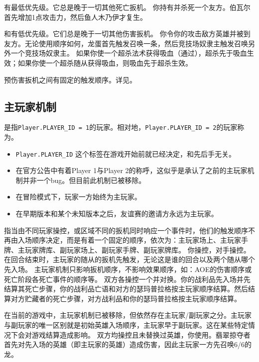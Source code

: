 有最低优先级。它总是晚于一切其他死亡扳机。
\example 你持有并杀死一个友方。伯瓦尔首先增加1点攻击力，然后鱼人木乃伊才复生。

和有低优先级。它们总是晚于一切其他伤害扳机。
\example 你令你的攻击敌方英雄并被到友方。无论使用顺序如何，龙蛋首先触发召唤一条，然后竞技场奴隶主触发召唤另外一个竞技场奴隶主。
\notice 如果你使一个超杀法术获得吸血（通过），超杀先于吸血生效；如果你使一个超杀随从获得吸血，则吸血先于超杀生效。

预伤害扳机之间有固定的触发顺序。详见。

\subsection{主玩家机制}

是指\texttt{Player.PLAYER\_ID = 1}的玩家。相对地，\texttt{Player.PLAYER\_ID = 2}的玩家称为。
\begin{itemize}
    \item \texttt{Player.PLAYER\_ID} 这个标签在游戏开始前就已经决定，和先后手无关。
    \item 在官方公告中有着Player 1与Player 2的称呼，这似乎是承认了之前的主玩家机制并非一个bug。但目前此机制已被移除。
    \item 在冒险模式下，玩家一方始终为主玩家。
    \item 在早期版本和某个未知版本之后，友谊赛的邀请方永远为主玩家。
\end{itemize}

指当由不同玩家操控，或区域不同的扳机同时响应一个事件时，他们的触发顺序不再由入场顺序决定，而是有着一个固定的顺序，依次为：主玩家场上、主玩家手牌、主玩家牌库、副玩家场上、副玩家手牌、副玩家牌库。
\example 你操控，对手操控。在回合结束时，主玩家的随从的扳机先触发，无论这是谁的回合以及两个随从哪个先入场。
\notice 主玩家机制只影响扳机顺序，不影响效果顺序，如：AOE的伤害顺序或死亡阶段各死亡事件的顺序等。
\example 双方各操控一个并对换。你的战利品先入场并先结算其死亡步骤，你的战利品亡语和对方的瑟玛普拉格按主玩家顺序结算。然后结算对方贮藏者的死亡步骤，对方战利品和你的瑟玛普拉格按主玩家顺序结算。

在当前的游戏中，主玩家机制已被移除，但依然存在主玩家/副玩家之分。主玩家与副玩家的唯一区别就是初始英雄入场顺序，主玩家早于副玩家。这在某些特定情况下会对游戏结算造成影响。
\example 双方均操控且未替换过英雄，你使用。翡翠掠夺者首先对先入场的英雄（即主玩家的英雄）造成伤害，因此主玩家一方先召唤6/6的龙。

